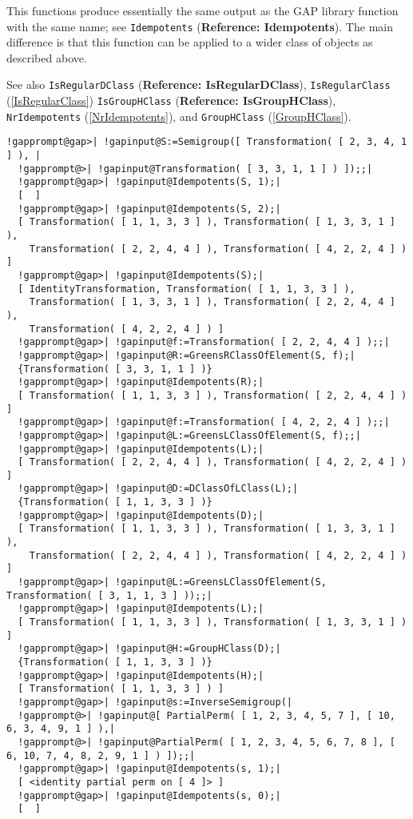 \documentclass[a4paper,11pt]{report}
\begin{document}
{{{ This functions produce essentially the same output as the \textsf{GAP} library function with the same name; see \texttt{Idempotents} (\textbf{Reference: Idempotents}). The main difference is that this function can be applied to a wider class of
objects as described above.

 See also \texttt{IsRegularDClass} (\textbf{Reference: IsRegularDClass}), \texttt{IsRegularClass} (\ref{IsRegularClass}) \texttt{IsGroupHClass} (\textbf{Reference: IsGroupHClass}), \texttt{NrIdempotents} (\ref{NrIdempotents}), and \texttt{GroupHClass} (\ref{GroupHClass}). 
\begin{Verbatim}[commandchars=!@|,fontsize=\small,frame=single,label=Example]
  !gapprompt@gap>| !gapinput@S:=Semigroup([ Transformation( [ 2, 3, 4, 1 ] ), |
  !gapprompt@>| !gapinput@Transformation( [ 3, 3, 1, 1 ] ) ]);;|
  !gapprompt@gap>| !gapinput@Idempotents(S, 1);|
  [  ]
  !gapprompt@gap>| !gapinput@Idempotents(S, 2);|
  [ Transformation( [ 1, 1, 3, 3 ] ), Transformation( [ 1, 3, 3, 1 ] ), 
    Transformation( [ 2, 2, 4, 4 ] ), Transformation( [ 4, 2, 2, 4 ] ) ]
  !gapprompt@gap>| !gapinput@Idempotents(S);|
  [ IdentityTransformation, Transformation( [ 1, 1, 3, 3 ] ), 
    Transformation( [ 1, 3, 3, 1 ] ), Transformation( [ 2, 2, 4, 4 ] ), 
    Transformation( [ 4, 2, 2, 4 ] ) ]
  !gapprompt@gap>| !gapinput@f:=Transformation( [ 2, 2, 4, 4 ] );;|
  !gapprompt@gap>| !gapinput@R:=GreensRClassOfElement(S, f);|
  {Transformation( [ 3, 3, 1, 1 ] )}
  !gapprompt@gap>| !gapinput@Idempotents(R);|
  [ Transformation( [ 1, 1, 3, 3 ] ), Transformation( [ 2, 2, 4, 4 ] ) ]
  !gapprompt@gap>| !gapinput@f:=Transformation( [ 4, 2, 2, 4 ] );;|
  !gapprompt@gap>| !gapinput@L:=GreensLClassOfElement(S, f);;|
  !gapprompt@gap>| !gapinput@Idempotents(L);|
  [ Transformation( [ 2, 2, 4, 4 ] ), Transformation( [ 4, 2, 2, 4 ] ) ]
  !gapprompt@gap>| !gapinput@D:=DClassOfLClass(L);|
  {Transformation( [ 1, 1, 3, 3 ] )}
  !gapprompt@gap>| !gapinput@Idempotents(D);|
  [ Transformation( [ 1, 1, 3, 3 ] ), Transformation( [ 1, 3, 3, 1 ] ), 
    Transformation( [ 2, 2, 4, 4 ] ), Transformation( [ 4, 2, 2, 4 ] ) ]
  !gapprompt@gap>| !gapinput@L:=GreensLClassOfElement(S, Transformation( [ 3, 1, 1, 3 ] ));;|
  !gapprompt@gap>| !gapinput@Idempotents(L);|
  [ Transformation( [ 1, 1, 3, 3 ] ), Transformation( [ 1, 3, 3, 1 ] ) ]
  !gapprompt@gap>| !gapinput@H:=GroupHClass(D);|
  {Transformation( [ 1, 1, 3, 3 ] )}
  !gapprompt@gap>| !gapinput@Idempotents(H);|
  [ Transformation( [ 1, 1, 3, 3 ] ) ]
  !gapprompt@gap>| !gapinput@s:=InverseSemigroup(|
  !gapprompt@>| !gapinput@[ PartialPerm( [ 1, 2, 3, 4, 5, 7 ], [ 10, 6, 3, 4, 9, 1 ] ),|
  !gapprompt@>| !gapinput@PartialPerm( [ 1, 2, 3, 4, 5, 6, 7, 8 ], [ 6, 10, 7, 4, 8, 2, 9, 1 ] ) ]);;|
  !gapprompt@gap>| !gapinput@Idempotents(s, 1);|
  [ <identity partial perm on [ 4 ]> ]
  !gapprompt@gap>| !gapinput@Idempotents(s, 0);|
  [  ]
\end{Verbatim}
 }

}}
\end{document}
